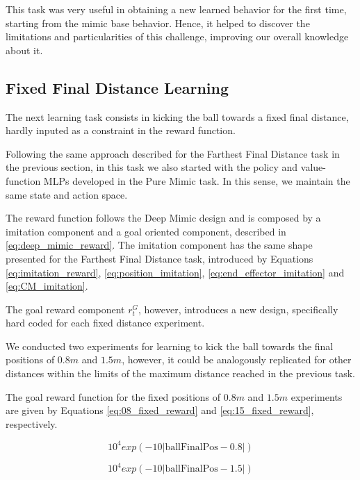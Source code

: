 This task was very useful in obtaining a new learned behavior for the first time, starting from the mimic base behavior. Hence, it helped to discover the limitations and particularities of this challenge, improving our overall knowledge about it.

\subsection{Fixed Final Distance Learning}

The next learning task consists in kicking the ball towards a fixed final distance, hardly inputed as a constraint in the reward function.

Following the same approach described for the Farthest Final Distance task in the previous section, in this task we also started with the policy and value-function MLPs developed in the Pure Mimic task. In this sense, we maintain the same state and action space.

The reward function follows the Deep Mimic design and is composed by a imitation component and a goal oriented component, described in \eqref{eq:deep_mimic_reward}. The imitation component has the same shape presented for the Farthest Final Distance task, introduced by Equations \eqref{eq:imitation_reward}, \eqref{eq:position_imitation}, \eqref{eq:end_effector_imitation} and \eqref{eq:CM_imitation}.

The goal reward component $r^G_t$, however, introduces a new design, specifically hard coded for each fixed distance experiment.

We conducted two experiments for learning to kick the ball towards the final positions of $0.8m$ and $1.5m$, however, it could be analogously replicated for other distances within the limits of the maximum distance reached in the previous task.

The goal reward function for the fixed positions of $0.8m$ and $1.5m$ experiments are given by Equations \eqref{eq:08_fixed_reward} and \eqref{eq:15_fixed_reward}, respectively.

\begin{equation}
10^4 exp \left( -10 |\text{ballFinalPos}-0.8| \right)
\label{eq:08_fixed_reward}
\end{equation}

\begin{equation}
10^4 exp \left( -10 |\text{ballFinalPos}-1.5| \right)
\label{eq:15_fixed_reward}
\end{equation}


